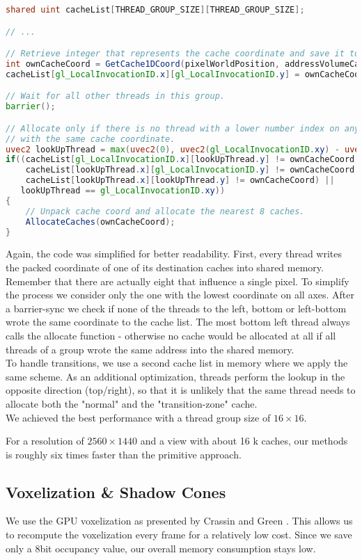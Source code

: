 \documentclass[thesis.tex]{subfiles}
\begin{document}
\begin{lstlisting}[language=GLSL]
shared uint cacheList[THREAD_GROUP_SIZE][THREAD_GROUP_SIZE];

// ...

// Retrieve integer that represents the cache coordinate and save it to the shared memory.
int ownCacheCoord = GetCache1DCoord(pixelWorldPosition, addressVolumeCascade);
cacheList[gl_LocalInvocationID.x][gl_LocalInvocationID.y] = ownCacheCoord;

// Wait for all other threads in this group.
barrier();

// Allocate only if there is no thread with a lower number index on any axis
// with the same cache coordinate.
uvec2 lookUpThread = max(uvec2(0), uvec2(gl_LocalInvocationID.xy) - uvec2(1));
if((cacheList[gl_LocalInvocationID.x][lookUpThread.y] != ownCacheCoord && 
    cacheList[lookUpThread.x][gl_LocalInvocationID.y] != ownCacheCoord &&
    cacheList[lookUpThread.x][lookUpThread.y] != ownCacheCoord) ||
   lookUpThread == gl_LocalInvocationID.xy))
{
	// Unpack cache coord and allocate the nearest 8 caches.
	AllocateCaches(ownCacheCoord);
}
\end{lstlisting}
Again, the code was simplified for better readability.
First, every thread writes the packed coordinate of one of its destination caches into shared memory.
Remember that there are actually eight that influence a single pixel.
To simplify the process we consider only the one with the lowest coordinate on all axes.
After a barrier-sync we check if none of the threads to the left, bottom or left-bottom wrote the same coordinate to the cache list.
The most bottom left thread always calls the allocate function - otherwise no cache would be allocated at all if all threads of a group wrote the same address into the shared memory.
\\
To handle transitions, we use a second cache list in memory where we apply the same scheme.
As an additional optimization, threads perform the lookup in the opposite direction (top/right), so that it is unlikely that the same thread needs to allocate both the "normal" and the "transition-zone" cache.
\\
We achieved the best performance with a thread group size of $16\times16$.

For a resolution of $2560\times1440$ and a view with about 16 k caches, our methods is roughly six times faster than the primitive approach.

\subsection{Voxelization \& Shadow Cones}
We use the GPU voxelization as presented by Crassin and Green \cite{bib:openglinsightsvoxel}.
This allows us to recompute the voxelization every frame for a relatively low cost.
Since we save only a 8bit occupancy value, our overall memory consumption stays low.
\end{document}
